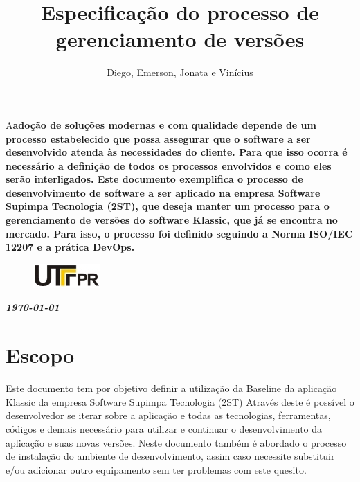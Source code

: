 \documentclass[	DIV=calc,%
							paper=a4,%
							fontsize=12pt,%
							onecolumn]{scrartcl}	 					%
\title{Especificação do processo de gerenciamento de versões}					%
\author{Diego, Emerson, Jonata e Vinícius }  	%
\date{}																				%
\newcommand{\initial}[1]{%
     \lettrine[lines=3,lhang=0.3,nindent=0em]{
     				\color{DarkGoldenrod}
     				{\textsf{#1}}}{}}
\begin{document}
\maketitle
\thispagestyle{fancy} 	
\thispagestyle{empty}		%




\initial{A}\textbf{adoção de soluções modernas e com qualidade depende de um processo estabelecido que possa assegurar que o software a
ser desenvolvido atenda às necessidades do cliente. Para que isso ocorra é necessário a
definição de todos os processos envolvidos e como eles serão interligados.
Este documento exemplifica o processo de desenvolvimento de software a ser aplicado 
na empresa Software Supimpa Tecnologia (2ST), que deseja manter um processo para o gerenciamento de versões do software Klassic, que já se encontra no mercado. Para isso, o processo foi definido seguindo a Norma ISO/IEC 12207 e a prática DevOps. }

\begin{figure}
	\centering
	\includegraphics{utfpr}
\end{figure}

\vspace{3cm}
\centerline{\textit{\textbf{\today}}}

\clearpage
    \renewcommand*\listfigurename{Lista de figuras}
\listoffigures

\renewcommand*\listtablename{Lista de tabelas}
\listoftables




\clearpage
\renewcommand{\contentsname}{Sumário}
\tableofcontents
\clearpage

\section{Escopo}

Este documento tem por objetivo definir a utilização da Baseline da aplicação Klassic da 
empresa Software Supimpa Tecnologia (2ST)
Através deste é possível o desenvolvedor se iterar sobre a aplicação e todas as
tecnologias, ferramentas, códigos e demais necessário para utilizar e continuar o desenvolvimento da
aplicação e suas novas versões.
Neste documento também é abordado o processo de instalação do ambiente de
desenvolvimento, assim caso necessite substituir e/ou adicionar outro equipamento sem ter problemas
com este quesito. 
\end{document}

